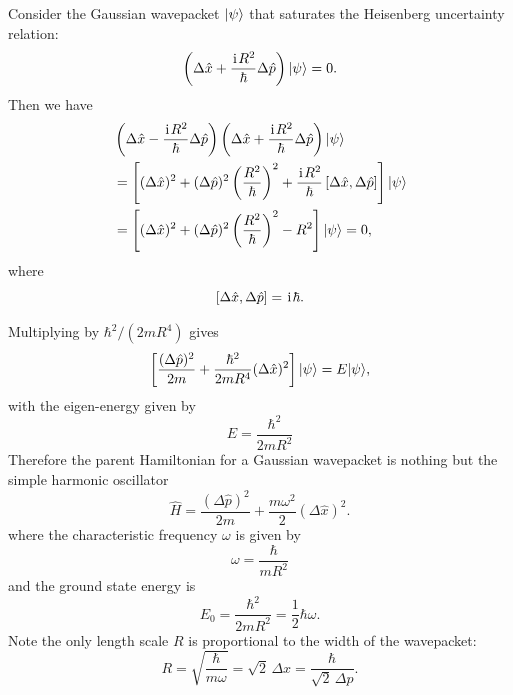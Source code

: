 Consider the Gaussian wavepacket $|{\psi}\rangle$ that saturates the Heisenberg uncertainty relation:
\begin{equation}\label{sho ground state condition}
\left(\Delta\hat{x}+\frac{\hspace{1pt}\mathrm{i}\hspace{1pt} R^2}{\hbar}\Delta\hat{p}\right)
|{\psi}\rangle=0.
\end{equation}
Then we have
\begin{align}
&\left(\Delta\hat{x}-\frac{\hspace{1pt}\mathrm{i}\hspace{1pt} R^2}{\hbar}\Delta\hat{p}\right)
 \left(\Delta\hat{x}+\frac{\hspace{1pt}\mathrm{i}\hspace{1pt} R^2}{\hbar}\Delta\hat{p}\right)
 |{\psi}\rangle
\nonumber\\
&=\left[
 (\Delta\hat{x})^2
 +(\Delta\hat{p})^2\left(\frac{R^2}{\hbar}\right)^2
 +\frac{\hspace{1pt}\mathrm{i}\hspace{1pt} R^2}{\hbar}
 \left[\Delta\hat{x},\Delta\hat{p}\right]
 \right]|{\psi}\rangle
\nonumber\\
&=\left[
 (\Delta\hat{x})^2
 +(\Delta\hat{p})^2\left(\frac{R^2}{\hbar}\right)^2
 -R^2
 \right]|{\psi}\rangle=0,
\end{align}
where
\begin{equation}
\left[\Delta\hat{x},\Delta\hat{p}\right]=\hspace{1pt}\mathrm{i}\hspace{1pt}\hbar.
\end{equation}



Multiplying by $\hbar^2/(2mR^4)$ gives
\begin{equation}
\left[
\frac{(\Delta\hat{p})^2}{2m}
+\frac{\hbar^2}{2mR^4}(\Delta\hat{x})^2
\right]|{\psi}\rangle
=E|{\psi}\rangle,
\end{equation}
with the eigen-energy given by
\begin{equation}
E=\frac{\hbar^2}{2mR^2}
\end{equation}
Therefore the parent Hamiltonian for a Gaussian wavepacket  is nothing but the simple harmonic oscillator
\begin{equation}
\hat{H}
=\frac{(\Delta\hat{p})^2}{2m}
+\frac{m\omega^2}{2}(\Delta\hat{x})^2.
\end{equation}
where the characteristic frequency $\omega$ is given by
\begin{equation}
\omega=\frac{\hbar}{mR^2}
\end{equation}
and the ground state energy is 
\begin{equation}
E_0=\frac{\hbar^2}{2mR^2}=\frac12\hbar\omega.
\end{equation}
Note the only length scale $R$ is proportional to the width of the wavepacket:
\begin{equation}
R=\sqrt{\frac{\hbar}{m\omega}}
=\sqrt{2}\,\Delta x
=\frac{\hbar}{\sqrt{2}\,\Delta p}.
\end{equation}

